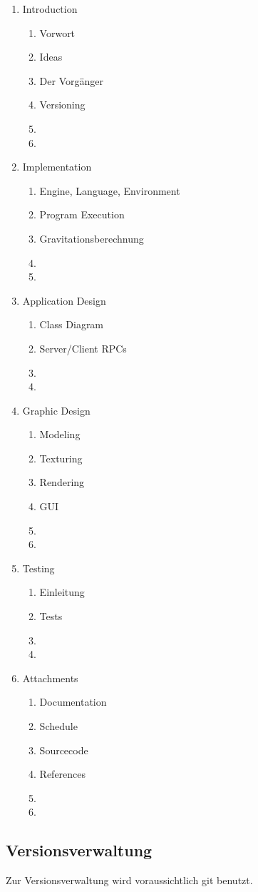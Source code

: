 \documentclass[a4paper]{article}
\begin{document}
\begin{enumerate}
  \item Introduction
  \begin{enumerate}
    \item Vorwort
    \item Ideas
    \item Der Vorgänger
    \item Versioning
    \item 
    \item 
  \end{enumerate}
  \item Implementation
  \begin{enumerate}
    \item Engine, Language, Environment
    \item Program Execution
    \item Gravitationsberechnung
    \item 
    \item 
  \end{enumerate}
  \item Application Design
  \begin{enumerate}
    \item Class Diagram
    \item Server/Client RPCs
    \item 
    \item 
  \end{enumerate}
  \item Graphic Design
  \begin{enumerate}
    \item Modeling
    \item Texturing
    \item Rendering
    \item GUI
    \item 
    \item 
  \end{enumerate}
  \item Testing
  \begin{enumerate}
    \item Einleitung
    \item Tests
    \item 
    \item 
  \end{enumerate}
  \item Attachments
  \begin{enumerate}
    \item Documentation
    \item Schedule
    \item Sourcecode
    \item References
    \item 
    \item 
  \end{enumerate}
\end{enumerate}

\subsection{Versionsverwaltung}
Zur Versionsverwaltung wird voraussichtlich git benutzt.
\end{document}
